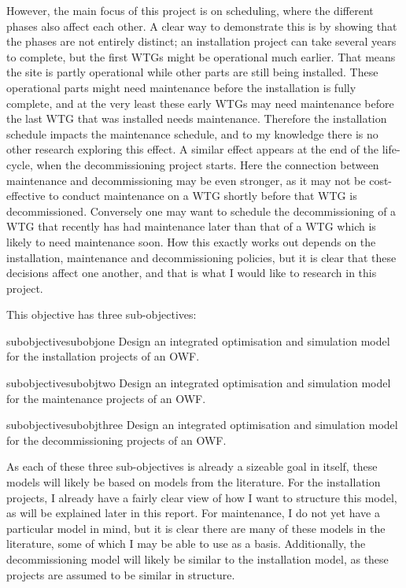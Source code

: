 \documentclass[a4paper,12pt]{article}
\begin{document}
However, the main focus of this project is on scheduling, where the different phases also affect each other. A clear way to demonstrate this is by showing that the phases are not entirely distinct; an installation project can take several years to complete, but the first WTGs might be operational much earlier. That means the site is partly operational while other parts are still being installed. These operational parts might need maintenance before the installation is fully complete, and at the very least these early WTGs may need maintenance before the last WTG that was installed needs maintenance. Therefore the installation schedule impacts the maintenance schedule, and to my knowledge there is no other research exploring this effect. 
A similar effect appears at the end of the life-cycle, when the decommissioning project starts. Here the connection between maintenance and decommissioning may be even stronger, as it may not be cost-effective to conduct maintenance on a WTG shortly before that WTG is decommissioned. Conversely one may want to schedule the decommissioning of a WTG that recently has had maintenance later than that of a WTG which is likely to need maintenance soon. How this exactly works out depends on the installation, maintenance and decommissioning policies, but it is clear that these decisions affect one another, and that is what I would like to research in this project. 

This objective has three sub-objectives:

\begin{restatable}{subobjective}{subobjone}
\label{subobjone}
Design an integrated optimisation and simulation model for the installation projects of an OWF. 
\end{restatable}

\begin{restatable}{subobjective}{subobjtwo}
\label{subobjtwo}
Design an integrated optimisation and simulation model for the maintenance projects of an OWF. 
\end{restatable}

\begin{restatable}{subobjective}{subobjthree}
\label{subobjthree}
Design an integrated optimisation and simulation model for the decommissioning projects of an OWF. 
\end{restatable}

As each of these three sub-objectives is already a sizeable goal in itself, these models will likely be based on models from the literature. For the installation projects, I already have a fairly clear view of how I want to structure this model, as will be explained later in this report. For maintenance, I do not yet have a particular model in mind, but it is clear there are many of these models in the literature, some of which I may be able to use as a basis. Additionally, the decommissioning model will likely be similar to the installation model, as these projects are assumed to be similar in structure. 
\end{document}
